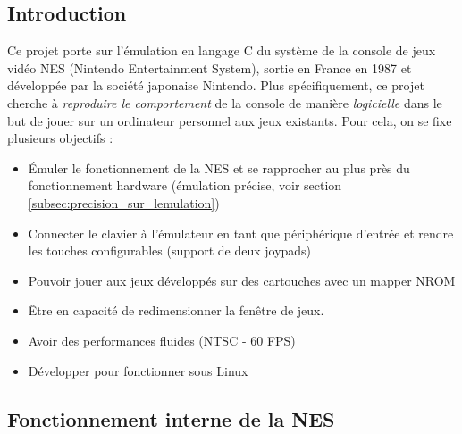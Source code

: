 \subsection{Introduction}

Ce projet porte sur l'émulation en langage C du système de la console de jeux vidéo NES (Nintendo Entertainment System), sortie en France en 1987 et développée par la société japonaise Nintendo. Plus spécifiquement, ce projet cherche à \emph{reproduire le comportement} de la console de manière \emph{logicielle} dans le but de jouer sur un ordinateur personnel aux jeux existants. Pour cela, on se fixe plusieurs objectifs :
\begin{itemize}
  \item Émuler le fonctionnement de la NES et se rapprocher au plus près du fonctionnement hardware (émulation précise, voir section \ref{subsec:precision_sur_lemulation})
  \item Connecter le clavier à l'émulateur en tant que périphérique d'entrée et rendre les touches configurables (support de deux joypads)
  \item Pouvoir jouer aux jeux développés sur des cartouches avec un mapper NROM
  \item Être en capacité de redimensionner la fenêtre de jeux.
  \item Avoir des performances fluides (NTSC - 60 FPS)
  \item Développer pour fonctionner sous Linux
\end{itemize}

\subsection{Fonctionnement interne de la NES}
\label{subsec:fonctionnement_interne_nes}

